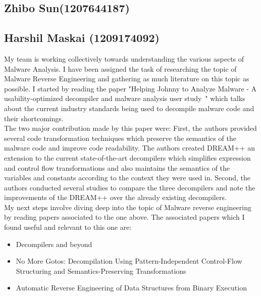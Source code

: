 \documentclass[16pt]{article}
\begin{document}
		
		\subsection{Zhibo Sun(1207644187)}
		\subsection{Harshil Maskai (1209174092)}
		My team is working collectively towards understanding the various aspects of Malware Analysis. I have been assigned the task of researching the topic of Malware Reverse Engineering and gathering as much literature on this topic as possible. I started by reading the paper "Helping Johnny to Analyze Malware - A usability-optimized decompiler and malware analysis user study~\cite{yakdan2016helping}" which talks about the current industry standards being used to decompile malware code and their shortcomings. \\
		The two major contribution made by this paper were:
		First, the authors provided several code transformation techniques which preserve the semantics of the malware code and improve code readability. The authors created DREAM++ an extension to the current state-of-the-art decompilers which simplifies expression and control flow transformations and also maintains the semantics of the variables and constants according to the context they were used in.
		Second, the authors conducted several studies to compare the three decompilers and note the improvements of the DREAM++ over the already existing decompilers.\\
		My next steps involve diving deep into the topic of Malware reverse engineering by reading papers associated to the one above. 
		The associated papers which I found useful and relevant to this one are:
		\begin{itemize}
			\item{Decompilers and beyond~\cite{guilfanov2008decompilers}}
			\item{No More Gotos: Decompilation Using Pattern-Independent Control-Flow Structuring and Semantics-Preserving Transformations~\cite{yakdan2015no}}
			\item{Automatic Reverse Engineering of Data Structures from Binary Execution~\cite{lin2010automatic}}
		\end{itemize}
		
\end{document}
